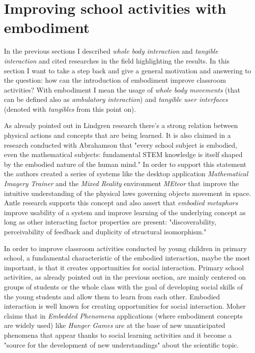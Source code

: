 \section{Improving school activities with embodiment}
In the previous sections I described \textit{whole body interaction} and \textit{tangible interaction} and cited researches in the field highlighting the results. In this section I want to take a step back and give a general motivation and answering to the question: how can the introduction of embodiment improve classroom activities? With embodiment I mean the usage of \textit{whole body movements} (that can be defined also as \textit{ambulatory interaction}) and \textit{tangible user interfaces} (denoted with \textit{tangibles} from this point on).

As already pointed out in Lindgren research \cite{lindgren:emboldened} there's a strong relation between physical actions and concepts that are being learned. It is also claimed in a research conducted with Abrahamson that "every school subject is embodied, even the mathematical subjects: fundamental STEM knowledge is itself shaped by the embodied nature of the human mind." \cite{abrahamson:embodiment} In order to support this statement the authors created a series of systems like the desktop application \textit{Mathematical Imagery Trainer} and the \textit{Mixed Reality} environment \textit{MEteor} that improve the intuitive understanding of the physical laws governing objects movement in space. Antle research supports this concept and also assert that \textit{embodied metaphors} improve usability of a system and improve learning of the underlying concept as long as other interacting factor properties are present: "discoverability, perceivability of feedback and duplicity of structural isomorphism." \cite{antle:body}

In order to improve classroom activities conducted by young children in primary school, a fundamental characteristic of the embodied interaction, maybe the most important, is that it creates opportunities for social interaction. Primary school activities, as already pointed out in the previous section, are mainly centered on groups of students or the whole class with the goal of developing social skills of the young students and allow them to learn from each other. Embodied interaction is well known for creating opportunities for social interaction. Moher \cite{moher:embedded} claims that in \textit{Embedded Phenomena} applications (where embodiment concepts are widely used) like \textit{Hunger Games} \cite{gnoli:hunger_games} are at the base of new unanticipated phenomena that appear thanks to social learning activities and it become a "source for the development of new understandings" \cite{gnoli:hunger_games} about the scientific topic.

